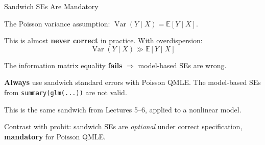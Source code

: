 \documentclass[aspectratio=169]{beamer}
\numberwithin{equation}{section}
\begin{document}
\begin{frame}{Sandwich SEs Are Mandatory}

The Poisson variance assumption: $\operatorname{Var}(Y \mid X) = \mathbb{E}[Y \mid X]$.

\pause

\bigskip

This is almost \textbf{never correct} in practice. With overdispersion:
\[
\operatorname{Var}(Y \mid X) \gg \mathbb{E}[Y \mid X]
\]

\pause

The information matrix equality \textbf{fails} $\Rightarrow$ model-based SEs are wrong.

\pause

\bigskip

\begin{tcolorbox}[colback=blue!5, colframe=blue!50, title=Practical Rule]
\textbf{Always} use sandwich standard errors with Poisson QMLE. The model-based SEs from \texttt{summary(glm(...))} are not valid.

\medskip

This is the same sandwich from Lectures 5--6, applied to a nonlinear model.
\end{tcolorbox}

\pause

\bigskip

Contrast with probit: sandwich SEs are \emph{optional} under correct specification, \textbf{mandatory} for Poisson QMLE.

\end{frame}

\end{document}
